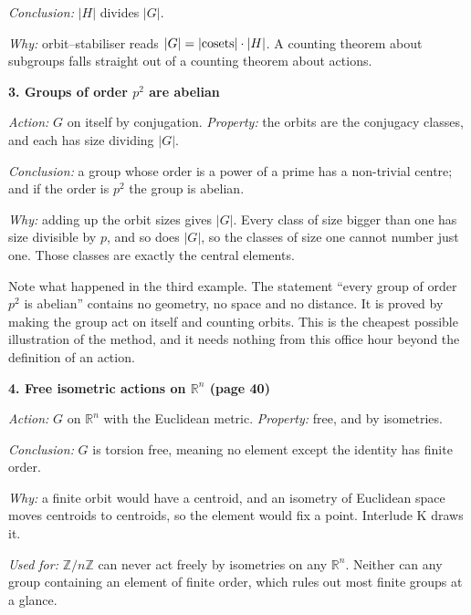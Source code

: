 \documentclass[10pt]{article}
\newcommand{\Z}{\mathbb{Z}}
\newcommand{\R}{\mathbb{R}}
\begin{document}
{\begin{minipage}[t]{744pt}
\begin{minipage}[t]{368pt}
\emph{Conclusion:} $|H|$ divides $|G|$.\par
\emph{Why:} orbit--stabiliser reads $|G|=|{\rm cosets}|\cdot|H|$. A counting theorem about subgroups falls straight out of a counting theorem about actions.\par\vspace{4pt}
{\sffamily\bfseries\color{big} 3. Groups of order $p^2$ are abelian}\par\vspace{1pt}
\emph{Action:} $G$ on itself by conjugation. \emph{Property:} the orbits are the conjugacy classes, and each has size dividing $|G|$.\par
\emph{Conclusion:} a group whose order is a power of a prime has a non-trivial centre; and if the order is $p^2$ the group is abelian.\par
\emph{Why:} adding up the orbit sizes gives $|G|$. Every class of size bigger than one has size divisible by $p$, and so does $|G|$, so the classes of size one cannot number just one. Those classes are exactly the central elements.\par\vspace{2pt}
\begin{bigpic}
Note what happened in the third example. The statement ``every group of order $p^2$ is abelian'' contains no geometry, no space and no distance. It is proved by making the group act on itself and counting orbits. This is the cheapest possible illustration of the method, and it needs nothing from this office hour beyond the definition of an action.
\end{bigpic}
\end{minipage}\hfill
\begin{minipage}[t]{360pt}\vspace{0pt}
{\sffamily\bfseries\color{big} 4. Free isometric actions on $\R^n$ (page 40)}\par\vspace{1pt}
\emph{Action:} $G$ on $\R^n$ with the Euclidean metric. \emph{Property:} free, and by isometries.\par
\emph{Conclusion:} $G$ is torsion free, meaning no element except the identity has finite order.\par
\emph{Why:} a finite orbit would have a centroid, and an isometry of Euclidean space moves centroids to centroids, so the element would fix a point. Interlude K draws it.\par
\emph{Used for:} $\Z/n\Z$ can never act freely by isometries on any $\R^n$. Neither can any group containing an element of finite order, which rules out most finite groups at a glance.\par\vspace{4pt}

\end{minipage}
\end{minipage}}
\end{document}
